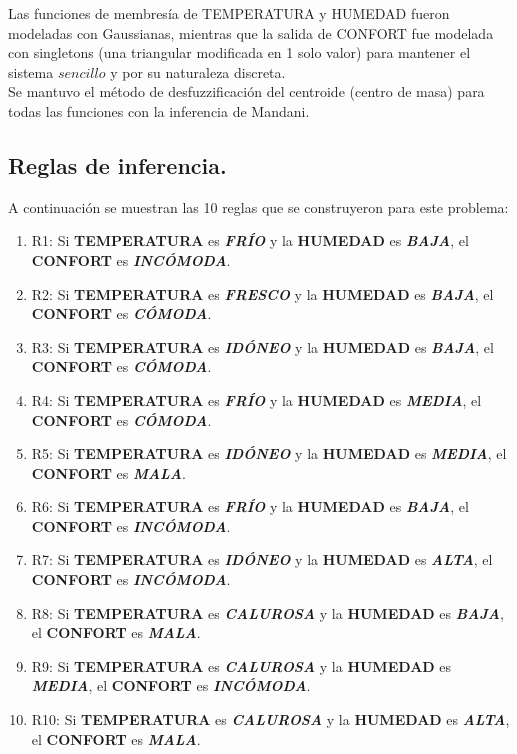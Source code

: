 \documentclass[11pt, letterpaper]{article}
\begin{document}
Las funciones de membresía de TEMPERATURA y HUMEDAD fueron modeladas con Gaussianas, mientras que la salida de CONFORT fue modelada con singletons (una triangular modificada en 1 solo valor) para mantener el sistema $sencillo$ y por su naturaleza discreta. \\

Se mantuvo el método de desfuzzificación del centroide (centro de masa) para todas las funciones con la inferencia de Mandani.\\

\newpage

\subsection{Reglas de inferencia.}

A continuación se muestran las 10 reglas que se construyeron para este problema:

\begin{enumerate}
	\item R1: Si \textbf{TEMPERATURA} es \textbf{\textit{FRÍO}} y la \textbf{HUMEDAD} es \textbf{\textit{BAJA}}, el \textbf{CONFORT} es \textbf{\textit{INCÓMODA}}.
	\item R2: Si \textbf{TEMPERATURA} es \textbf{\textit{FRESCO}} y la \textbf{HUMEDAD} es \textbf{\textit{BAJA}}, el \textbf{CONFORT} es \textbf{\textit{CÓMODA}}.
	\item R3: Si \textbf{TEMPERATURA} es \textbf{\textit{IDÓNEO}} y la \textbf{HUMEDAD} es \textbf{\textit{BAJA}}, el \textbf{CONFORT} es \textbf{\textit{CÓMODA}}.
	\item R4: Si \textbf{TEMPERATURA} es \textbf{\textit{FRÍO}} y la \textbf{HUMEDAD} es \textbf{\textit{MEDIA}}, el \textbf{CONFORT} es \textbf{\textit{CÓMODA}}.
	\item R5: Si \textbf{TEMPERATURA} es \textbf{\textit{IDÓNEO}} y la \textbf{HUMEDAD} es \textbf{\textit{MEDIA}}, el \textbf{CONFORT} es \textbf{\textit{MALA}}.
	\item R6: Si \textbf{TEMPERATURA} es \textbf{\textit{FRÍO}} y la \textbf{HUMEDAD} es \textbf{\textit{BAJA}}, el \textbf{CONFORT} es \textbf{\textit{INCÓMODA}}.
	\item R7: Si \textbf{TEMPERATURA} es \textbf{\textit{IDÓNEO}} y la \textbf{HUMEDAD} es \textbf{\textit{ALTA}}, el \textbf{CONFORT} es \textbf{\textit{INCÓMODA}}.
	\item R8: Si \textbf{TEMPERATURA} es \textbf{\textit{CALUROSA}} y la \textbf{HUMEDAD} es \textbf{\textit{BAJA}}, el \textbf{CONFORT} es \textbf{\textit{MALA}}.
	\item R9: Si \textbf{TEMPERATURA} es \textbf{\textit{CALUROSA}} y la \textbf{HUMEDAD} es \textbf{\textit{MEDIA}}, el \textbf{CONFORT} es \textbf{\textit{INCÓMODA}}.
	\item R10: Si \textbf{TEMPERATURA} es \textbf{\textit{CALUROSA}} y la \textbf{HUMEDAD} es \textbf{\textit{ALTA}}, el \textbf{CONFORT} es \textbf{\textit{MALA}}.
\end{enumerate}
\end{document}

